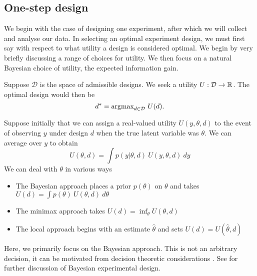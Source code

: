 \subsection{One-step design}
\label{sec:onestep}
We begin with the case of designing one experiment, after which we will collect and analyse our data. In selecting an optimal experiment design, we must first say with respect to what utility a design is considered optimal. We begin by very briefly discussing a range of choices for utility. We then focus on a natural Bayesian choice of utility, the expected information gain.

Suppose $\mathcal{D}$ is the space of admissible designs. We seek a utility $U: \mathcal{D} \to \mathbb{R}$. The optimal design would then be
\begin{equation}
	d^* = \text{argmax}_{d \in \mathcal{D}} \ U(d).
\end{equation}

Suppose initially that we can assign a real-valued utility $U(y, \theta, d)$ to the event of observing $y$ under design $d$ when the true latent variable was $\theta$. We can average over $y$ to obtain
\begin{equation}
	U(\theta, d) = \int p(y | \theta, d)\ U(y, \theta, d)\ dy
\end{equation}
We can deal with $\theta$ in various ways
\begin{itemize}
	\item The Bayesian approach \cite{chaloner1995} places a prior $p(\theta)$ on $\theta$ and takes \\ $U(d) = \int p(\theta)\ U(\theta, d)\ d\theta$
	\item The minimax approach \cite{fedorov1972} takes $U(d) = \inf_\theta U(\theta, d)$
	\item The local approach \cite{pronzato2010} begins with an estimate $\hat{\theta}$ and sets $U(d) = U(\hat{\theta}, d)$
\end{itemize}
Here, we primarily focus on the Bayesian approach. This is not an arbitrary decision, it can be motivated from decision theoretic considerations \cite{lindley1972}. See \cite{chaloner1995} for further discussion of Bayesian experimental design.


